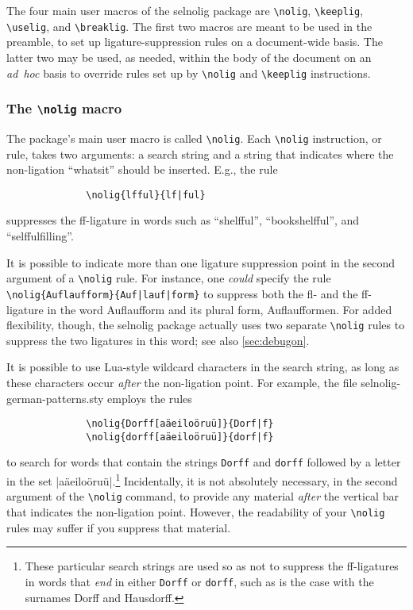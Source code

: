 \documentclass[11pt]{article}
\newcommand{\pkg}[1]{\textsf{#1}}
\newcommand{\opt}[1]{\texttt{#1}}
\newcommand{\cmmd}[1]{\texttt{\textbackslash #1}}
\begin{document}
The four main user macros of the \pkg{selnolig} package are \cmmd{nolig}, \cmmd{keeplig}, \cmmd{uselig}, and \cmmd{breaklig}. The first two macros are meant to be used in the preamble, to set up ligature-suppression rules on a document-wide basis. The latter two may be used, as needed, within the body of the document on an \emph{ad~hoc} basis to override rules set up by \cmmd{nolig} and \cmmd{keeplig} instructions.



\subsubsection{The \cmmd{nolig} macro}
\label{sec:nolig}

The package's main user macro is called \cmmd{nolig}. Each \cmmd{nolig} instruction, or rule, takes two arguments: a search string and a string that indicates where the non-ligation \enquote{whatsit} should be inserted. E.g., the rule
\begin{Verbatim}
              \nolig{lfful}{lf|ful}
\end{Verbatim}
suppresses the ff-ligature in words such as \enquote{shelfful}, \enquote{bookshelfful}, and \enquote{selffulfilling}.

It is possible to indicate more than one ligature suppression point in the second argument of a \cmmd{nolig} rule. For instance, one \emph{could} specify the rule \Verb+\nolig{Auflaufform}{Auf|lauf|form}+ to suppress both the fl- and the ff-ligature in the word Auflaufform and its plural form, Auflaufformen. For added flexibility, though, the \pkg{selnolig} package actually uses two separate \cmmd{nolig} rules to suppress the two ligatures in this word; see also \cref{sec:debugon}.

It is possible to use Lua-style wildcard characters in the search string, as long as these characters occur \emph{after} the non-ligation point. For example, the file \pkg{selnolig-german-patterns.sty} employs the rules 
\begin{Verbatim}
              \nolig{Dorff[aäeiloöruü]}{Dorf|f}
              \nolig{dorff[aäeiloöruü]}{dorf|f}
\end{Verbatim}
to search for words that contain the strings \opt{Dorff} and \opt{dorff} followed by a letter in the set |aäeiloöruü|.\footnote{These particular search strings are used so as not to suppress the ff-ligatures in words that \emph{end} in either \opt{Dorff} or \opt{dorff}, such as is the case with the surnames Dorff and Hausdorff.} Incidentally, it is not absolutely necessary, in the second argument of the \cmmd{nolig} command, to provide any material \emph{after} the vertical bar that indicates the non-ligation point. However, the readability of your \cmmd{nolig} rules may suffer if you suppress that material.
\end{document}
